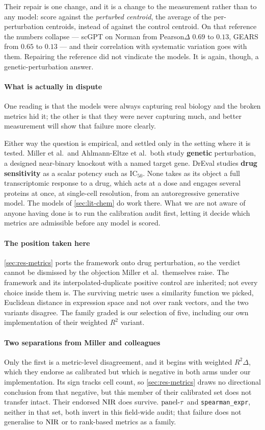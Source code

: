 Their repair is one change, and it is a change to the measurement rather than to
any model: score against the \emph{perturbed centroid}, the average of the
per-perturbation centroids, instead of against the control centroid. On that
reference the numbers collapse --- scGPT on Norman from Pearson$\Delta$ $0.69$ to
$0.13$, GEARS from $0.65$ to $0.13$ --- and their correlation with systematic
variation goes with them. Repairing the reference did not vindicate the models.
It is again, though, a genetic-perturbation answer.

\paragraph{What is actually in dispute} One reading is that the models were
always capturing real biology and the broken metrics hid it; the other is that
they were never capturing much, and better measurement will show that failure
more clearly.

Either way the question is empirical, and settled only in the setting where it is
tested. Miller et al.\ and Ahlmann-Eltze et al.\ both study \textbf{genetic}
perturbation, a designed near-binary knockout with a named target gene. DrEval
studies \textbf{drug sensitivity} as a scalar potency such as IC$_{50}$. None
takes as its object a full transcriptomic response to a drug, which acts at a
dose and engages several proteins at once, at single-cell resolution, from an
autoregressive generative model. The models of \cref{sec:lit-chem} do work
there. What we are not aware of anyone having done is to run the calibration audit first, letting it decide which metrics are admissible before any model is
scored.

\paragraph{The position taken here}
\cref{sec:res-metrics} ports the \DRF{} framework onto drug perturbation, so the
verdict cannot be dismissed by the objection Miller et al.\ themselves raise. The
framework and its interpolated-duplicate positive control are inherited; not
every choice inside them is. The surviving metric uses a similarity function we
picked, Euclidean distance in expression space and not over rank vectors, and the
two variants disagree. The family graded is our selection of five, including our
own implementation of their weighted $R^2$ variant.

\paragraph{Two separations from Miller and colleagues} Only the first is a metric-level
disagreement, and it begins with weighted $R^2\Delta$, which
they endorse as calibrated but which is negative in both arms under our
implementation. Its sign tracks cell count, so \cref{sec:res-metrics} draws no
directional conclusion from that negative, but this member of their calibrated
set does not transfer intact. Their endorsed $\textrm{NIR}$ does survive. $\textrm{panel-}\tau$ and
\texttt{spearman\_expr}, neither in that set, both invert in this field-wide
audit; that failure does not generalise to $\textrm{NIR}$ or to rank-based metrics as a
family.

